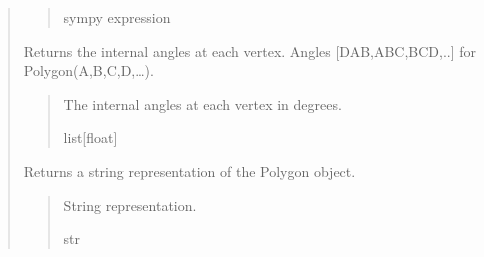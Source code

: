 \documentclass[letterpaper,10pt,english]{sphinxmanual}
\begin{document}
\begin{quote}
\begin{fulllineitems}
\begin{fulllineitems}
\begin{quote}
\begin{description}
\sphinxAtStartPar
sympy expression

\end{description}\end{quote}

\end{fulllineitems}


\begin{fulllineitems}
\label{\detokenize{pygeox:pygeox.custom_objects.Polygon.internal_angles}}
\pysigstartsignatures
\pysigline
{}
\pysigstopsignatures
\sphinxAtStartPar
Returns the internal angles at each vertex. Angles {[}DAB,ABC,BCD,..{]} for Polygon(A,B,C,D,…).
\begin{quote}\begin{description}
\sphinxAtStartPar
The internal angles at each vertex in degrees.

\sphinxAtStartPar
list{[}float{]}

\end{description}\end{quote}

\end{fulllineitems}


\begin{fulllineitems}
\label{\detokenize{pygeox:pygeox.custom_objects.Polygon.num_sides}}
\pysigstartsignatures
\pysigline
{}
\pysigstopsignatures
\sphinxAtStartPar
Returns a string representation of the Polygon object.
\begin{quote}\begin{description}
\sphinxAtStartPar
String representation.

\sphinxAtStartPar
str

\end{description}\end{quote}

\end{fulllineitems}


\end{fulllineitems}
\end{quote}
\end{document}
